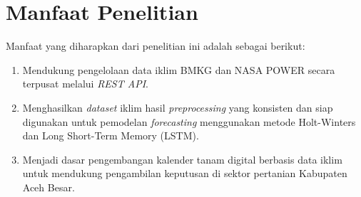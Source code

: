 \section{Manfaat Penelitian}
Manfaat yang diharapkan dari penelitian ini adalah sebagai berikut:
\begin{enumerate}
    \item Mendukung pengelolaan data iklim BMKG dan NASA POWER secara terpusat melalui \textit{REST API}.
    \item Menghasilkan \textit{dataset} iklim hasil \textit{preprocessing} yang konsisten dan siap digunakan untuk pemodelan \textit{forecasting} menggunakan metode Holt-Winters dan Long Short-Term Memory (LSTM).
    \item Menjadi dasar pengembangan kalender tanam digital berbasis data iklim untuk mendukung pengambilan keputusan di sektor pertanian Kabupaten Aceh Besar.
\end{enumerate}

